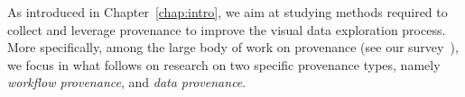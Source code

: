 

As introduced in Chapter~\ref{chap:intro}, we aim at studying methods required to collect and leverage provenance to improve the visual data exploration process. More specifically, among the large body of work on provenance (see our survey~\cite{Herschel2017survey}), we focus in what follows on research on two specific provenance types, namely \emph{workflow provenance}, and \emph{data provenance}.

%
%


